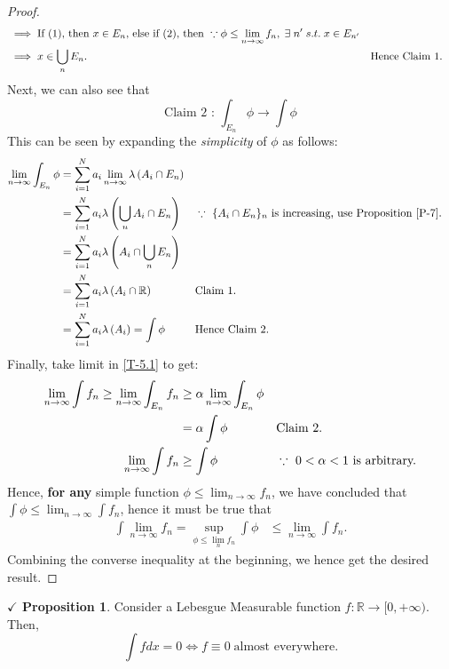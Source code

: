 \documentclass{article}
\theoremstyle{definition}
\theoremstyle{remark}
\theoremstyle{definition}
\theoremstyle{definition}
\newtheorem{proposition}{$\checkmark$ Proposition}
\theoremstyle{definition}
\newcommand{\intrs}{\cap}
\newcommand{\bunion}{\bigcup}
\newcommand{\R}{\mathbb{R}}
\newcommand{\lm}[1]{\lambda\left (#1\right )}
\begin{document}
\begin{proof}
\begin{align*}
		&\implies \text{If $ (1) $, then $ x\in E_n $, else if $ (2) $, then }\because \phi \le \lim_{n\to \infty}f_n, \;\exists \; n^{\prime} \;s.t.\; x\in E_{n^{\prime}}\\
		&\implies x\in \bunion_{n} E_n. && \text{Hence Claim 1.}
	\end{align*}
Next, we can also see that
\[\text{Claim 2 : }\int_{E_n}\phi \longrightarrow \int \phi\]
This can be seen by expanding the \emph{simplicity} of $ \phi $ as follows:
\begin{align*}
\lim_{n\to \infty}	\int_{E_n} \phi &= \sum_{i=1}^{N} a_i\lim_{n\to \infty} \lm{A_i\intrs E_n}\\
	&= \sum_{i=1}^{N} a_i \lm{\bunion_{n} A_i \intrs E_n} &&\because \text{ $ \{A_i\intrs E_n\}_n $ is increasing, use Proposition \ref{P-7}.}\\
	&= \sum_{i=1}^{N} a_i \lm{A_i \intrs \bunion_n E_n}\\
	&= \sum_{i=1}^{N}a_i \lm{A_i \intrs \R} &&\text{Claim 1.}\\
	&= \sum_{i=1}^{N} a_i \lm{A_i} = \int \phi &&\text{Hence Claim 2.}
\end{align*}
Finally, take limit in \eqref{T-5.1} to get:
\begin{align*}
	\lim_{n\to \infty} \int f_n \ge \lim_{n\to \infty} \int_{E_n}f_n &\ge \alpha\lim_{n\to \infty} \int_{E_n} \phi &&\\
	&=\alpha \int \phi&&\text{Claim 2.}\\
	\lim_{n\to \infty} \int f_n &\ge \int \phi &&\because\text{ $ 0<\alpha <1 $ is arbitrary.}
\end{align*}
Hence, \textbf{for any} simple function $ \phi  \le \lim_{n\to \infty}f_n$, we have concluded that $ \int \phi \le \lim_{n\to \infty} \int f_n  $, hence it must be true that
\begin{align*}
	\int \lim_{n\to \infty} f_n = \sup_{\phi \le \lim_{n} f_n} \int \phi &\le \lim_{n\to \infty}\int f_n.
\end{align*}
Combining the converse inequality at the beginning, we hence get the desired result.
\end{proof}
\hrulefill
\begin{proposition}\label{P-34}
	Consider a Lebesgue Measurable function $ f : \R\to [0,+\infty) $. Then,
	\[ \int f dx = 0 \mathbf{\iff} f \equiv 0 \;\text{almost everywhere.} \]
\end{proposition}
\end{document}
